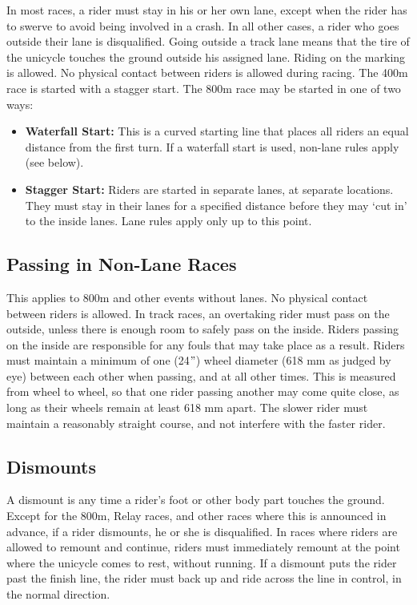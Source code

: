 In most races, a rider must stay in his or her own lane, except when the rider has to swerve to avoid being involved in a crash.
In all other cases, a rider who goes outside their lane is disqualified.
Going outside a track lane means that the tire of the unicycle touches the ground outside his assigned lane.
Riding on the marking is allowed.
No physical contact between riders is allowed during racing.
The 400m race is started with a stagger start.
The 800m race may be started in one of two ways:
\begin{itemize}
\item \textbf{Waterfall Start:} This is a curved starting line that places all riders an equal distance from the first turn.
If a waterfall start is used, non-lane rules apply (see below).
\item \textbf{Stagger Start:} Riders are started in separate lanes, at separate locations.
They must stay in their lanes for a specified distance before they may `cut in' to the inside lanes.
Lane rules apply only up to this point.
\end{itemize}

\subsection{Passing in Non-Lane Races \label{subsec:track-field_lane-use_non-lane-races}}

This applies to 800m and other events without lanes.
No physical contact between riders is allowed.
In track races, an overtaking rider must pass on the outside, unless there is enough room to safely pass on the inside.
Riders passing on the inside are responsible for any fouls that may take place as a result.
Riders must maintain a minimum of one (24$"$) wheel diameter (618 mm as judged by eye) between each other when passing, and at all other times.
This is measured from wheel to wheel, so that one rider passing another may come quite close, as long as their wheels remain at least 618 mm apart.
The slower rider must maintain a reasonably straight course, and not interfere with the faster rider.


\subsection{Dismounts}

A dismount is any time a rider's foot or other body part touches the ground.
Except for the 800m, Relay races, and other races where this is announced in advance, if a rider dismounts, he or she is disqualified.
In races where riders are allowed to remount and continue, riders must immediately remount at the point where the unicycle comes to rest, without running.
If a dismount puts the rider past the finish line, the rider must back up and ride across the line in control, in the normal direction.

